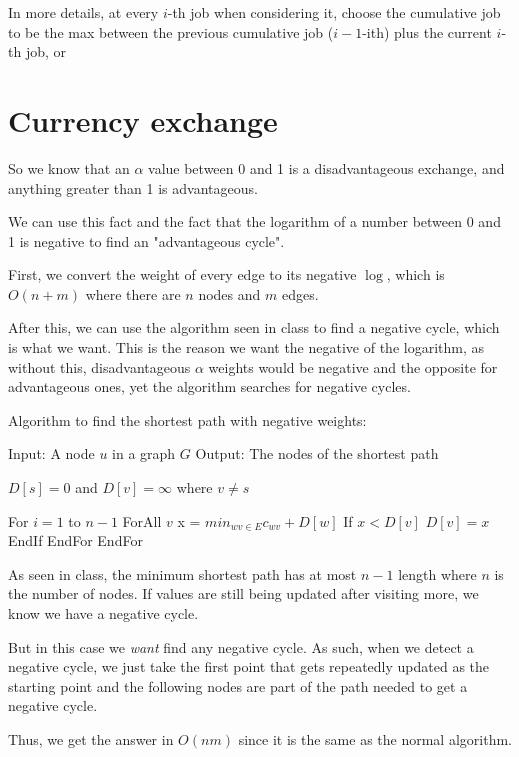 \documentclass[11pt,letterpaper]{article}
\begin{document}
		In more details, at every $i$-th job when considering it, choose the cumulative job to be the max between the previous cumulative job ($i-1$-ith) plus the current $i$-th job, or
	
	\section{Currency exchange}
		So we know that an $\alpha$ value between 0 and 1 is a disadvantageous exchange, and anything greater than 1 is advantageous.
		
		We can use this fact and the fact that the logarithm of a number between 0 and 1 is negative to find an "advantageous cycle".
		
		First, we convert the weight of every edge to its negative $\log$, which is $O(n+m)$ where there are $n$ nodes and $m$ edges.
		
		After this, we can use the algorithm seen in class to find a negative cycle, which is what we want. This is the reason we want the negative of the logarithm, as without this, disadvantageous $\alpha$ weights would be negative and the opposite for advantageous ones, yet the algorithm searches for negative cycles.
		\begin{center}
			Algorithm to find the shortest path with negative weights:
		\end{center}
			Input: A node $u$ in a graph $G$\newline
			Output: The nodes of the shortest path
		\begin{algorithm}[caption={}, label={alg1}]
			$D[s] = 0$ and $D[v] = \infty$ where $v \neq s$
			
			For $i = 1$ to $n-1$
				ForAll $v$
					x = $min_{wv\in E} c_{wv} +D[w]$
					If $x < D[v]$
						$D[v] = x$
					EndIf
				EndFor
			EndFor
		\end{algorithm}
		
		As seen in class, the minimum shortest path has at most $n - 1$ length where $n$ is the number of nodes.
		If values are still being updated after visiting more, we know we have a negative cycle.
		
		But in this case we \textit{want} find any negative cycle.
		As such, when we detect a negative cycle, we just take the first point that gets repeatedly updated as the starting point and the following nodes are part of the path needed to get a negative cycle.
		
		Thus, we get the answer in $O(nm)$ since it is the same as the normal algorithm.
	
\end{document}
